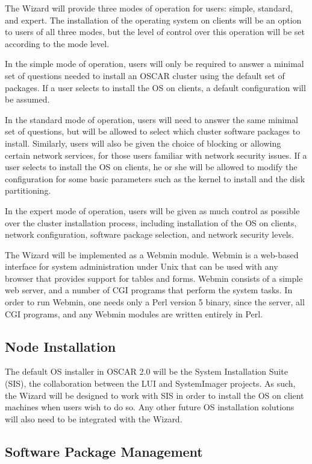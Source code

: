 The Wizard will provide three modes of operation for users: simple,
standard, and expert. The installation of the operating system on
clients will be an option to users of all three modes, but the level
of control over this operation will be set according to the mode
level.

In the simple mode of operation, users will only be required to answer
a minimal set of questions needed to install an OSCAR cluster using
the default set of packages. If a user selects to install the OS on
clients, a default configuration will be assumed.

In the standard mode of operation, users will need to answer the same
minimal set of questions, but will be allowed to select which cluster
software packages to install. Similarly, users will also be given the
choice of blocking or allowing certain network services, for those
users familiar with network security issues.  If a user selects to
install the OS on clients, he or she will be allowed to modify the
configuration for some basic parameters such as the kernel to install
and the disk partitioning.

In the expert mode of operation, users will be given as much control
as possible over the cluster installation process, including
installation of the OS on clients, network configuration, software
package selection, and network security levels.

The Wizard will be implemented as a Webmin module. Webmin is a
web-based interface for system administration under Unix that can be
used with any browser that provides support for tables and
forms. Webmin consists of a simple web server, and a number of CGI
programs that perform the system tasks. In order to run Webmin, one
needs only a Perl version 5 binary, since the server, all CGI
programs, and any Webmin modules are written entirely in Perl.

\subsection{Node Installation}

The default OS installer in OSCAR 2.0 will be the System Installation
Suite (SIS), the collaboration between the LUI and SystemImager
projects. As such, the Wizard will be designed to work with SIS in
order to install the OS on client machines when users wish to do
so. Any other future OS installation solutions will also need to be
integrated with the Wizard.

\subsection{Software Package Management}
\label{sec:design-software-package-mgmt}

